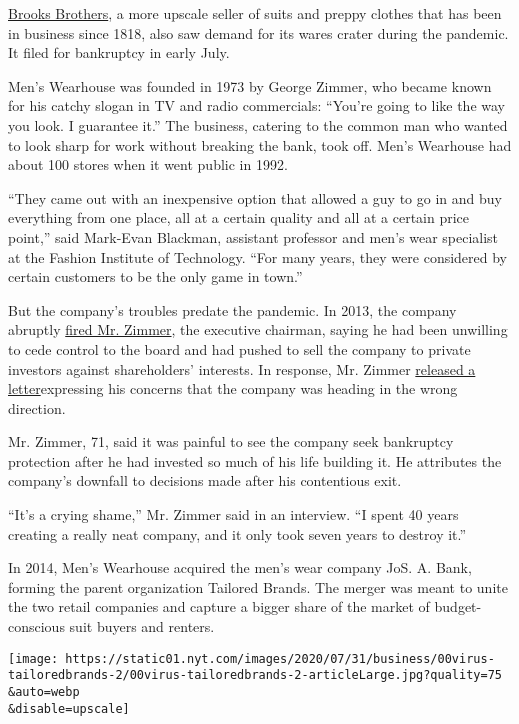 \href{https://www.nytimes.com/2020/07/08/business/brooks-brothers-chapter-11-bankruptcy.html}{Brooks
Brothers}, a more upscale seller of suits and preppy clothes that has
been in business since 1818, also saw demand for its wares crater during
the pandemic. It filed for bankruptcy in early July.

Men's Wearhouse was founded in 1973 by George Zimmer, who became known
for his catchy slogan in TV and radio commercials: ``You're going to
like the way you look. I guarantee it.'' The business, catering to the
common man who wanted to look sharp for work without breaking the bank,
took off. Men's Wearhouse had about 100 stores when it went public in
1992.

``They came out with an inexpensive option that allowed a guy to go in
and buy everything from one place, all at a certain quality and all at a
certain price point,'' said Mark-Evan Blackman, assistant professor and
men's wear specialist at the Fashion Institute of Technology. ``For many
years, they were considered by certain customers to be the only game in
town.''

But the company's troubles predate the pandemic. In 2013, the company
abruptly
\href{https://www.nytimes.com/2013/06/20/business/dumping-the-face-and-founder-of-mens-wearhouse.html}{fired
Mr. Zimmer}, the executive chairman, saying he had been unwilling to
cede control to the board and had pushed to sell the company to private
investors against shareholders' interests. In response, Mr. Zimmer
\href{https://blogs.wsj.com/corporate-intelligence/2013/06/26/an-open-letter-from-the-ousted-mens-wearhouse-boss/}{released
a letter}expressing his concerns that the company was heading in the
wrong direction.

Mr. Zimmer, 71, said it was painful to see the company seek bankruptcy
protection after he had invested so much of his life building it. He
attributes the company's downfall to decisions made after his
contentious exit.

``It's a crying shame,'' Mr. Zimmer said in an interview. ``I spent 40
years creating a really neat company, and it only took seven years to
destroy it.''

In 2014, Men's Wearhouse acquired the men's wear company JoS. A. Bank,
forming the parent organization Tailored Brands. The merger was meant to
unite the two retail companies and capture a bigger share of the market
of budget-conscious suit buyers and renters.

\texttt{[image: https://static01.nyt.com/images/2020/07/31/business/00virus-tailoredbrands-2/00virus-tailoredbrands-2-articleLarge.jpg?quality=75\\\&auto=webp\\\&disable=upscale]}

